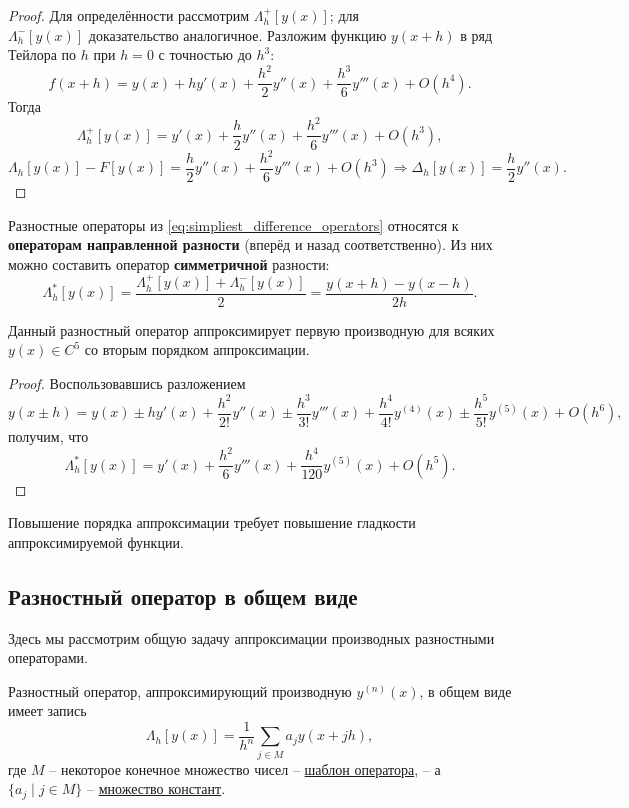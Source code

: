 \documentclass[../main.tex]{subfile}
\begin{document}
\begin{proof}
	Для определённости рассмотрим $\Lambda_h^+[y(x)]$; для \\
	$\Lambda_h^-[y(x)]$ доказательство аналогичное. Разложим функцию
	$y(x+h)$ в ряд Тейлора по $h$ при $h=0$ с точностью до $h^3$:
	\[f(x+h)=y(x)+hy'(x)+\frac{h^2}{2}y''(x)+\frac{h^3}{6}y'''(x)
	+O(h^4).\]
	Тогда
	\[\Lambda_h^+[y(x)]=y'(x)+\frac{h}{2}y''(x)+\frac{h^2}{6}
	y'''(x)+O(h^3),\]
	\[\Lambda_h[y(x)]-F[y(x)]=\frac{h}{2}y''(x)+\frac
	{h^2}{6}y'''(x)+O(h^3)\Rightarrow \Delta_h[y(x)]=\frac{h}{2}y''(x).\]
\end{proof}

\begin{define}
	Разностные операторы из \eqref{eq:simpliest_difference_operators}
	относятся к \textbf{операторам направленной разности} (вперёд и назад
	соответственно). Из них можно составить оператор \textbf{симметричной}
	разности:
	\[\Lambda_h^*[y(x)]=\frac{\Lambda_h^+[y(x)]+\Lambda_h^-[y(x)]}{2}=
	\frac{y(x+h)-y(x-h)}{2h}.\]
\end{define}

\begin{lemma}
	Данный разностный оператор аппроксимирует первую производную для всяких
	$y(x)\in C^5$ со вторым порядком аппроксимации.
\end{lemma}

\begin{proof}
	Воспользовавшись разложением
	\[y(x\pm h)=y(x)\pm hy'(x)+\frac{h^2}{2!}y''(x)\pm\frac{h^3}{3!}y'''(x)+
	\frac{h^4}{4!}y^{(4)}(x)\pm\frac{h^5}{5!}y^{(5)}(x)+O(h^6),\]
	получим, что
	\[\Lambda_h^*[y(x)]=y'(x)+\frac{h^2}{6}y'''(x)+\frac{h^4}{120}y^{(5)}(x)
	+O(h^5).\]
\end{proof}

\begin{remark}
	Повышение порядка аппроксимации требует повышение гладкости
	аппроксимируемой функции.
\end{remark}

\subsection{Разностный оператор в общем виде}
Здесь мы рассмотрим общую задачу аппроксимации производных разностными
операторами.

\begin{define}\label{eq:general_difference_operator}
	Разностный оператор, аппроксимирующий производную $y^{(n)}(x)$, в общем
	виде имеет запись
	\[\boxed{\Lambda_h[y(x)]=\frac{1}{h^n}\sum_{j\in M}a_jy(x+jh)},\]
	где $M$ -- некоторое конечное множество чисел -- \underline{шаблон
	оператора}, -- а \\ $\{a_j\mid j\in M\}$ -- \underline{множество констант}.
\end{define}
\end{document}
